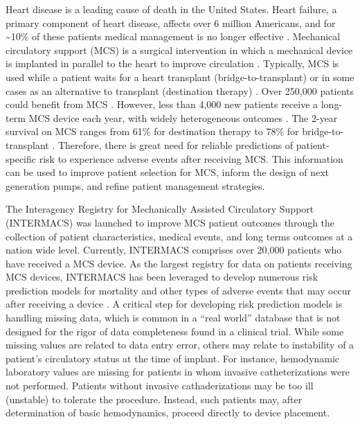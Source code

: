 \documentclass{article}
\begin{document}
\linenumbers

Heart disease is a leading cause of death in the United States. Heart
failure, a primary component of heart disease, affects over 6 million
Americans, and for \textasciitilde10\% of these patients medical
management is no longer effective
\cite{benjamin2017heart,national2017health}. Mechanical circulatory
support (MCS) is a surgical intervention in which a mechanical device is
implanted in parallel to the heart to improve circulation
\cite{patel2014contemporary}. Typically, MCS is used while a patient
waits for a heart transplant (bridge-to-transplant) or in some cases as
an alternative to transplant (destination therapy)
\cite{slaughter2009advanced}. Over 250,000 patients could benefit from
MCS \cite{miller2011left}. However, less than 4,000 new patients receive
a long-term MCS device each year, with widely heterogeneous outcomes
\cite{stewart2011keeping}. The 2-year survival on MCS ranges from 61\%
for destination therapy to 78\% for bridge-to-transplant
\cite{patel2014contemporary}. Therefore, there is great need for
reliable predictions of patient-specific risk to experience adverse
events after receiving MCS. This information can be used to improve
patient selection for MCS, inform the design of next generation pumps,
and refine patient management strategies.

The Interagency Registry for Mechanically Assisted Circulatory Support
(INTERMACS) was launched to improve MCS patient outcomes through the
collection of patient characteristics, medical events, and long terms
outcomes at a nation wide level. Currently, INTERMACS comprises over
20,000 patients who have received a MCS device. As the largest registry
for data on patients receiving MCS devices, INTERMACS has been leveraged
to develop numerous risk prediction models for mortality and other types
of adverse events that may occur after receiving a device
\cite{kirklin2017eighth, kormos2019society, Adamo950}. A critical step
for developing risk prediction models is handling missing data, which is
common in a ``real world'' database that is not designed for the rigor
of data completeness found in a clinical trial. While some missing
values are related to data entry error, others may relate to instability
of a patient's circulatory status at the time of implant. For instance,
hemodynamic laboratory values are missing for patients in whom invasive
catheterizations were not performed. Patients without invasive
cathaderizations may be too ill (unstable) to tolerate the procedure.
Instead, such patients may, after determination of basic hemodynamics,
proceed directly to device placement.
\end{document}
